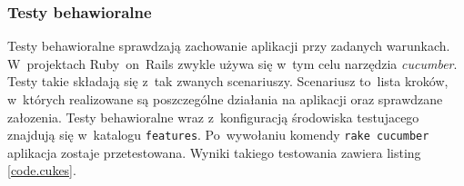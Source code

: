 \subsubsection{Testy behawioralne}

Testy behawioralne sprawdzają zachowanie aplikacji przy zadanych warunkach. W~projektach Ruby~on~Rails zwykle używa się w~tym celu narzędzia \textit{cucumber}. Testy takie składają się z~tak zwanych scenariuszy. Scenariusz to~lista kroków, w~których realizowane są poszczególne działania na aplikacji oraz sprawdzane załozenia. Testy behawioralne wraz z~konfiguracją środowiska testujacego znajdują się w~katalogu \texttt{features}. Po~wywołaniu komendy \verb+rake cucumber+ aplikacja zostaje przetestowana. Wyniki takiego testowania zawiera listing \ref{code.cukes}.

